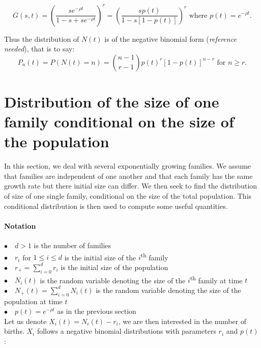 \documentclass{article}
\begin{document}
\begin{equation}
G(s,t)=\left( \dfrac{s e^{-\rho t}}{1-s+s e^{-\rho t}} \right)^r=\left( \dfrac{sp(t)}{1-s[1-p(t)]} \right)^r \text{ where }p(t)=e^{-\rho t}.
\end{equation}

Thus the distribution of $N(t)$ is of the negative binomial form (\textit{reference needed}), that is to say: 
\begin{equation}
P_n(t)=P(N(t)=n)=\binom{n-1}{r-1} p(t)^r [1-p(t)]^{n-r} \text{ for } n \geq r.
\end{equation}

 
 \section{Distribution of the size of one family conditional on the size of the population}
 In this section, we deal with several exponentially growing families. We assume that families are independent of one another and that each family has the same growth rate but there initial size can differ. We then seek to find the distribution of size of one single family, conditional on the size of the total population. This conditional distribution is then used to compute some useful quantities.
 \\
  \paragraph{Notation} $ $\\
 $\bullet \quad d>1$ is the number of families\\
 $\bullet \quad r_i $ for $1 \leq i \leq d$ is the initial size of the $i$\textsuperscript{th} family\\
 $\displaystyle \bullet \quad r_+=\sum_{i=0}^d r_i$ is the initial size of the population \\
 $\bullet \quad N_i(t) $ is the random variable denoting the size of the $i$\textsuperscript{th} family at time $t$ \\
 $\displaystyle \bullet \quad N_+(t)=\sum_{i=0}^d N_i(t)$ is the random variable denoting the size of the population at time $t$ \\
 $\bullet \quad p(t)=e^{-\rho t} $ as in the previous section\\
 
 Let us denote $X_i(t)=N_i(t)-r_i$, we are then interested in the number of births. $X_i$ follows a negative binomial distributions with parameters $r_i$ and $p(t)$:
\end{document}
